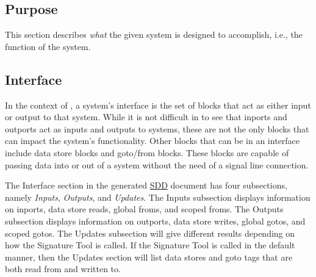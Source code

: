 \documentclass{mcscert}
\newcommand{\sigtool}{Signature Tool}
\newcommand{\topsystemnolink}{Top-System} %
\newcommand{\topsystem}{\hyperref[def:topsystem]{\topsystemnolink{}}}
\begin{document}
  
    \subsection{Purpose} \label{ssec:purpose-description}
    This section describes \emph{what} the given system is designed to accomplish, i.e., the function of the system. 

    \subsection{Interface} 
    \label{ssec:interface-description}
    
In the context of \simulink{}, a system's interface is the set of blocks that act as either input or output to that system. 
While it is not difficult in \simulink{} to see that inports and outports act as inputs and outputs to systems, these are not the only blocks that can impact the system's functionality. 
Other blocks that can be in an interface include data store blocks and goto/from blocks. 
These blocks are capable of passing data into or out of a system without the need of a signal line connection.

The Interface section in the generated \hyperref[acr:sdd]{SDD} document has four subsections, namely \emph{Inputs}, \emph{Outputs}, and \emph{Updates}. 
The Inputs
subsection displays information on inports, data store reads, global froms, and scoped froms. 
The Outputs subsection displays information on outports, data store writes, global gotos, and scoped gotos. 
The Updates subsection will give different results depending on how the \sigtool{} is called. 
If the \sigtool{} is called in the default manner, then the Updates section will list data stores and goto tags that are both read from and written to. 
\end{document}
